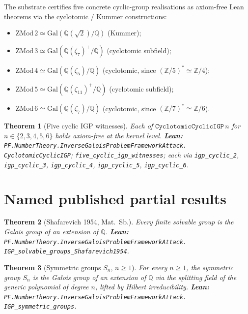 \documentclass[11pt,a4paper]{article}
\theoremstyle{plain}
\newtheorem{theorem}{Theorem}[section]
\theoremstyle{definition}
\begin{document}
The substrate certifies five concrete cyclic-group realisations as
axiom-free Lean theorems via the cyclotomic / Kummer constructions:
\begin{itemize}[leftmargin=*,nosep]
\item $\mathrm{ZMod}\,2 \simeq \mathrm{Gal}(\mathbb{Q}(\sqrt{2})/\mathbb{Q})$
  (Kummer);
\item $\mathrm{ZMod}\,3 \simeq \mathrm{Gal}(\mathbb{Q}(\zeta_{7})^{+}/\mathbb{Q})$
  (cyclotomic subfield);
\item $\mathrm{ZMod}\,4 \simeq \mathrm{Gal}(\mathbb{Q}(\zeta_{5})/\mathbb{Q})$
  (cyclotomic, since $(\mathbb{Z}/5)^{*} \simeq \mathbb{Z}/4$);
\item $\mathrm{ZMod}\,5 \simeq \mathrm{Gal}(\mathbb{Q}(\zeta_{11})^{+}/\mathbb{Q})$
  (cyclotomic subfield);
\item $\mathrm{ZMod}\,6 \simeq \mathrm{Gal}(\mathbb{Q}(\zeta_{7})/\mathbb{Q})$
  (cyclotomic, since $(\mathbb{Z}/7)^{*} \simeq \mathbb{Z}/6$).
\end{itemize}

\begin{theorem}[Five cyclic IGP witnesses]
\label{thm:five-cyclic}
Each of $\mathtt{CyclotomicCyclicIGP}\,n$ for $n \in \{2,3,4,5,6\}$
holds axiom-free at the kernel level.
\textbf{Lean:}
\texttt{PF.NumberTheory.InverseGaloisProblemFrameworkAttack.\\
CyclotomicCyclicIGP};
\texttt{five\_cyclic\_igp\_witnesses}; each via
\texttt{igp\_cyclic\_2}, \texttt{igp\_cyclic\_3},
\texttt{igp\_cyclic\_4}, \texttt{igp\_cyclic\_5},
\texttt{igp\_cyclic\_6}.
\end{theorem}

\section{Named published partial results}
\label{sec:named}

\begin{theorem}[Shafarevich 1954, Mat.\ Sb.]
\label{thm:shafarevich}
Every finite solvable group is the Galois group of an extension of
$\mathbb{Q}$.
\textbf{Lean:}
\texttt{PF.NumberTheory.InverseGaloisProblemFrameworkAttack.\\
IGP\_solvable\_groups\_Shafarevich1954}.
\end{theorem}

\begin{theorem}[Symmetric groups $S_{n}$, $n \ge 1$]
\label{thm:sn}
For every $n \ge 1$, the symmetric group $S_{n}$ is the Galois group
of an extension of $\mathbb{Q}$ via the splitting field of the generic
polynomial of degree $n$, lifted by Hilbert irreducibility.
\textbf{Lean:}
\texttt{PF.NumberTheory.InverseGaloisProblemFrameworkAttack.\\
IGP\_symmetric\_groups}.
\end{theorem}
\end{document}
